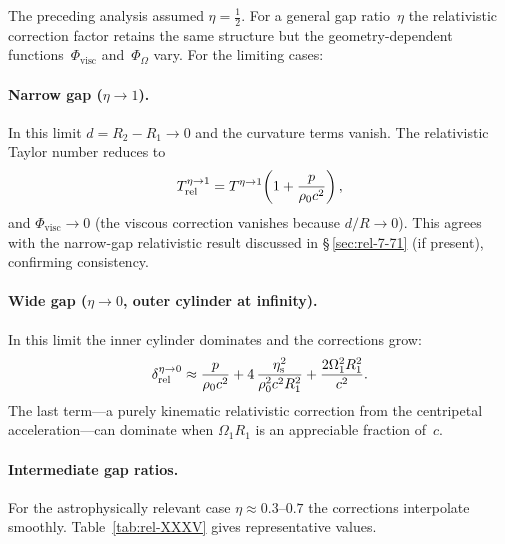 The preceding analysis assumed $\eta = \frac{1}{2}$.  For a general
gap ratio~$\eta$ the relativistic correction factor retains the same
structure but the geometry-dependent functions~$\Phi_{\mathrm{visc}}$
and~$\Phi_{\Omega}$ vary.  For the limiting cases:

\paragraph{Narrow gap ($\eta\to 1$).}  In this limit
$d = R_{2}-R_{1}\to 0$ and the curvature terms vanish.  The
relativistic Taylor number reduces to
\begin{equation}
\label{eq:rel-7-304}
T_{\mathrm{rel}}^{\eta\to 1}
= T^{\eta\to 1}\!\left(1 + \frac{p}{\rho_0 c^{2}}\right),
\end{equation}
and $\Phi_{\mathrm{visc}}\to 0$ (the viscous correction vanishes because
$d/R\to 0$).  This agrees with the narrow-gap relativistic result
discussed in \S\,\ref{sec:rel-7-71} (if present), confirming
consistency.

\paragraph{Wide gap ($\eta\to 0$, outer cylinder at infinity).}
In this limit the inner cylinder dominates and the corrections grow:
\begin{equation}
\label{eq:rel-7-305}
\delta_{\mathrm{rel}}^{\eta\to 0}
\approx \frac{p}{\rho_0 c^{2}}
  + 4\,\frac{\eta_{\mathrm{s}}^{2}}{\rho_0^{2}c^{2}R_{1}^{2}}
  + \frac{2\Omega_{1}^{2}R_{1}^{2}}{c^{2}}.
\end{equation}
The last term---a purely kinematic relativistic correction from the
centripetal acceleration---can dominate when $\Omega_{1}R_{1}$ is an
appreciable fraction of~$c$.

\paragraph{Intermediate gap ratios.}  For the astrophysically
relevant case $\eta \approx 0.3$--$0.7$ the corrections interpolate
smoothly.  Table~\ref{tab:rel-XXXV} gives representative values.

